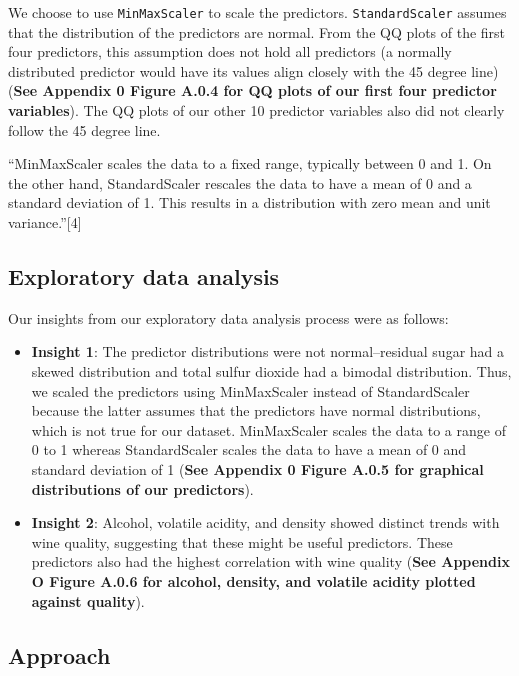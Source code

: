 \documentclass[
  letterpaper,
  DIV=11,
  numbers=noendperiod]{scrartcl}
\begin{document}
We choose to use \texttt{MinMaxScaler} to scale the predictors.
\texttt{StandardScaler} assumes that the distribution of the predictors
are normal. From the QQ plots of the first four predictors, this
assumption does not hold all predictors (a normally distributed
predictor would have its values align closely with the 45 degree line)
(\textbf{See Appendix 0 Figure A.0.4 for QQ plots of our first four
predictor variables}). The QQ plots of our other 10 predictor variables
also did not clearly follow the 45 degree line.

``MinMaxScaler scales the data to a fixed range, typically between 0 and
1. On the other hand, StandardScaler rescales the data to have a mean of
0 and a standard deviation of 1. This results in a distribution with
zero mean and unit variance.''{[}4{]}

\hypertarget{exploratory-data-analysis}{%
\subsection{Exploratory data analysis}\label{exploratory-data-analysis}}

Our insights from our exploratory data analysis process were as follows:

\begin{itemize}
\item
  \textbf{Insight 1}: The predictor distributions were not
  normal--residual sugar had a skewed distribution and total sulfur
  dioxide had a bimodal distribution. Thus, we scaled the predictors
  using MinMaxScaler instead of StandardScaler because the latter
  assumes that the predictors have normal distributions, which is not
  true for our dataset. MinMaxScaler scales the data to a range of 0 to
  1 whereas StandardScaler scales the data to have a mean of 0 and
  standard deviation of 1 (\textbf{See Appendix 0 Figure A.0.5 for
  graphical distributions of our predictors}).
\item
  \textbf{Insight 2}: Alcohol, volatile acidity, and density showed
  distinct trends with wine quality, suggesting that these might be
  useful predictors. These predictors also had the highest correlation
  with wine quality (\textbf{See Appendix O Figure A.0.6 for alcohol,
  density, and volatile acidity plotted against quality}).
\end{itemize}

\hypertarget{approach}{%
\subsection{Approach}\label{approach}}
\end{document}
